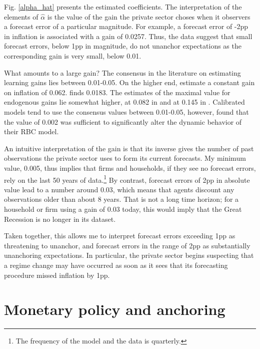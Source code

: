 \documentclass[11pt]{article}
\renewcommand{\[}{\begin{equation}}
\renewcommand{\]}{\end{equation}}
\begin{document}
Fig. \ref{alpha_hat} presents the estimated coefficients. The interpretation of the elements of $\hat{\alpha}$ is the value of the gain the private sector choses when it observers a forecast error of a particular magnitude. For example, a forecast error of -2pp in inflation is associated with a gain of 0.0257. Thus, the data suggest that small forecast errors, below 1pp in magnitude, do not unanchor expectations as the corresponding gain is very small, below 0.01.

What amounts to a large gain? The consensus in the literature on estimating learning gains lies between 0.01-0.05. On the higher end, \cite{branch2006simple} estimate a constant gain on inflation of 0.062. \cite{milani2007expectations} finds 0.0183. The estimates of the maximal value for endogenous gains lie somewhat higher, at 0.082 in \cite{milani2014learning} and at 0.145 in \cite{carvalho2019anchored}. Calibrated models tend to use the consensus values between 0.01-0.05, however, \cite{eusepi2011expectations} found that the value of 0.002 was sufficient to significantly alter the dynamic behavior of their RBC model. 

An intuitive interpretation of the gain is that its inverse gives the number of past observations the private sector uses to form its current forecasts. My minimum value, 0.005, thus implies that firms and households, if they see no forecast errors, rely on the last 50 years of data.\footnote{The frequency of the model and the data is quarterly.} By contrast, forecast errors of 2pp in absolute value lead to a number around 0.03, which means that agents discount any observations older than about 8 years. That is not a long time horizon; for a household or firm using a gain of 0.03 today, this would imply that the Great Recession is no longer in its dataset.

Taken together, this allows me to interpret forecast errors exceeding 1pp as threatening to unanchor, and forecast errors in the range of 2pp as substantially unanchoring expectations. In particular, the private sector begins suspecting that a regime change may have occurred as soon as it sees that its forecasting procedure missed inflation by 1pp.  


\section{Monetary policy and anchoring}\label{analytical}
\end{document}
